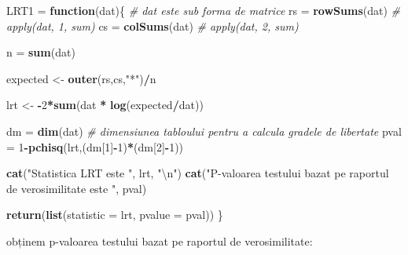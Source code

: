 \documentclass[]{article}
\newenvironment{Shaded}{\begin{snugshade}}{\end{snugshade}}
\newcommand{\KeywordTok}[1]{\textcolor[rgb]{0.13,0.29,0.53}{\textbf{#1}}}
\newcommand{\DataTypeTok}[1]{\textcolor[rgb]{0.13,0.29,0.53}{#1}}
\newcommand{\DecValTok}[1]{\textcolor[rgb]{0.00,0.00,0.81}{#1}}
\newcommand{\FloatTok}[1]{\textcolor[rgb]{0.00,0.00,0.81}{#1}}
\newcommand{\CharTok}[1]{\textcolor[rgb]{0.31,0.60,0.02}{#1}}
\newcommand{\StringTok}[1]{\textcolor[rgb]{0.31,0.60,0.02}{#1}}
\newcommand{\CommentTok}[1]{\textcolor[rgb]{0.56,0.35,0.01}{\textit{#1}}}
\newcommand{\ControlFlowTok}[1]{\textcolor[rgb]{0.13,0.29,0.53}{\textbf{#1}}}
\newcommand{\OperatorTok}[1]{\textcolor[rgb]{0.81,0.36,0.00}{\textbf{#1}}}
\newcommand{\NormalTok}[1]{#1}
\begin{document}
\begin{Shaded}
\begin{Highlighting}[]
\NormalTok{LRT1 =}\StringTok{ }\ControlFlowTok{function}\NormalTok{(dat)\{}
  \CommentTok{# dat este sub forma de matrice }
\NormalTok{  rs =}\StringTok{ }\KeywordTok{rowSums}\NormalTok{(dat) }\CommentTok{# apply(dat, 1, sum)}
\NormalTok{  cs =}\StringTok{ }\KeywordTok{colSums}\NormalTok{(dat) }\CommentTok{# apply(dat, 2, sum)}
  
\NormalTok{  n =}\StringTok{ }\KeywordTok{sum}\NormalTok{(dat)}
  
\NormalTok{  expected <-}\StringTok{ }\KeywordTok{outer}\NormalTok{(rs,cs,}\StringTok{"*"}\NormalTok{)}\OperatorTok{/}\NormalTok{n}
  
\NormalTok{  lrt <-}\StringTok{ }\OperatorTok{-}\DecValTok{2}\OperatorTok{*}\KeywordTok{sum}\NormalTok{(dat }\OperatorTok{*}\StringTok{ }\KeywordTok{log}\NormalTok{(expected}\OperatorTok{/}\NormalTok{dat)) }
  
\NormalTok{  dm =}\StringTok{ }\KeywordTok{dim}\NormalTok{(dat) }\CommentTok{# dimensiunea tabloului pentru a calcula gradele de libertate}
\NormalTok{  pval =}\StringTok{ }\DecValTok{1}\OperatorTok{-}\KeywordTok{pchisq}\NormalTok{(lrt,(dm[}\DecValTok{1}\NormalTok{]}\OperatorTok{-}\DecValTok{1}\NormalTok{)}\OperatorTok{*}\NormalTok{(dm[}\DecValTok{2}\NormalTok{]}\OperatorTok{-}\DecValTok{1}\NormalTok{))}
  
  \KeywordTok{cat}\NormalTok{(}\StringTok{"Statistica LRT este "}\NormalTok{, lrt, }\StringTok{"}\CharTok{\textbackslash{}n}\StringTok{"}\NormalTok{)}
  \KeywordTok{cat}\NormalTok{(}\StringTok{"P-valoarea testului bazat pe raportul de verosimilitate este "}\NormalTok{, pval)}
  
  \KeywordTok{return}\NormalTok{(}\KeywordTok{list}\NormalTok{(}\DataTypeTok{statistic =}\NormalTok{ lrt, }\DataTypeTok{pvalue =}\NormalTok{ pval))}
\NormalTok{\}}
\end{Highlighting}
\end{Shaded}

obținem p-valoarea testului bazat pe raportul de verosimilitate:

\begin{Shaded}
\end{Shaded}
\end{document}
